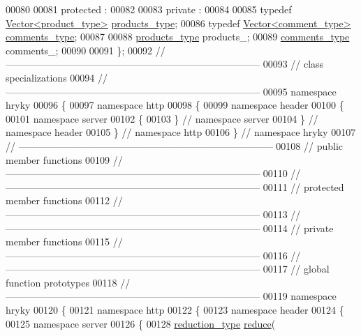 \begin{DoxyCode}
00080 
00081 \textcolor{keyword}{protected} :
00082 
00083 \textcolor{keyword}{private} :
00084 
00085     \textcolor{keyword}{typedef} \hyperlink{classhryky_1_1_vector}{Vector<product_type>} \hyperlink{classhryky_1_1_vector}{products_type};
00086     \textcolor{keyword}{typedef} \hyperlink{classhryky_1_1_vector}{Vector<comment_type>} \hyperlink{classhryky_1_1_vector}{comments_type};
00087 
00088     \hyperlink{classhryky_1_1_vector}{products_type} products\_;
00089     \hyperlink{classhryky_1_1_vector}{comments_type} comments\_;
00090 
00091 \};
00092 \textcolor{comment}{//
      ------------------------------------------------------------------------------}
00093 \textcolor{comment}{// class specializations}
00094 \textcolor{comment}{//
      ------------------------------------------------------------------------------}
00095 \textcolor{keyword}{namespace }hryky
00096 \{
00097 \textcolor{keyword}{namespace }http
00098 \{
00099 \textcolor{keyword}{namespace }header
00100 \{
00101 \textcolor{keyword}{namespace }server
00102 \{
00103 \} \textcolor{comment}{// namespace server}
00104 \} \textcolor{comment}{// namespace header}
00105 \} \textcolor{comment}{// namespace http}
00106 \} \textcolor{comment}{// namespace hryky}
00107 \textcolor{comment}{//
      ------------------------------------------------------------------------------}
00108 \textcolor{comment}{// public member functions}
00109 \textcolor{comment}{//
      ------------------------------------------------------------------------------}
00110 \textcolor{comment}{//
      ------------------------------------------------------------------------------}
00111 \textcolor{comment}{// protected member functions}
00112 \textcolor{comment}{//
      ------------------------------------------------------------------------------}
00113 \textcolor{comment}{//
      ------------------------------------------------------------------------------}
00114 \textcolor{comment}{// private member functions}
00115 \textcolor{comment}{//
      ------------------------------------------------------------------------------}
00116 \textcolor{comment}{//
      ------------------------------------------------------------------------------}
00117 \textcolor{comment}{// global function prototypes}
00118 \textcolor{comment}{//
      ------------------------------------------------------------------------------}
00119 \textcolor{keyword}{namespace }hryky
00120 \{
00121 \textcolor{keyword}{namespace }http
00122 \{
00123 \textcolor{keyword}{namespace }header
00124 \{
00125 \textcolor{keyword}{namespace }server
00126 \{
00128     \hyperlink{namespacehryky_a343a9a4c36a586be5c2693156200eadc}{reduction_type} \hyperlink{namespacehryky_1_1http_a08fc36a78a8e2908140fcd102829a566}{reduce}(

\end{DoxyCode}
